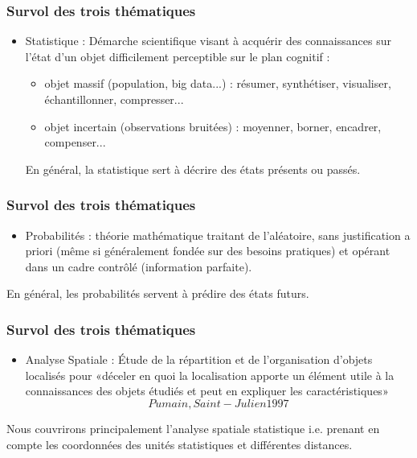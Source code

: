 \documentclass{beamer}
\begin{document}
\begin{frame}
\frametitle{Survol des trois thématiques}
\begin{itemize}
\item \alert{Statistique} : Démarche scientifique visant à acquérir des connaissances sur l'état d'un objet difficilement perceptible sur le plan cognitif : 
\begin{itemize}
\item objet \alert{massif} (population, big data...) : résumer, synthétiser, visualiser, échantillonner, compresser...
\item objet \alert{incertain} (observations bruitées) : moyenner, borner, encadrer, compenser... \newline \pause
\end{itemize}

En général, la statistique sert à  \alert{décrire} des états présents ou passés.


\end{itemize}
\end{frame}


\begin{frame}
\frametitle{Survol des trois thématiques}

\begin{itemize}
\item \alert{Probabilités} : théorie mathématique traitant de l'aléatoire, sans justification a priori (même si généralement fondée sur des besoins pratiques) et opérant dans un cadre contrôlé (information parfaite).
\newline \pause
\end{itemize}
En général, les probabilités servent à  \alert{prédire} des états futurs.
\end{frame}




\begin{frame}
\frametitle{Survol des trois thématiques}
\begin{itemize}
\item \alert{Analyse Spatiale} : Étude de la répartition et de l’organisation d’objets localisés pour «déceler en quoi la localisation apporte un élément utile à la connaissances des objets étudiés et peut en expliquer les caractéristiques» \[Pumain, Saint-Julien 1997\]
\newline \pause
\end{itemize}


Nous couvrirons principalement l'analyse spatiale \alert{statistique} i.e. prenant en compte les coordonnées des unités statistiques et différentes distances.
\end{frame}
\end{document}
